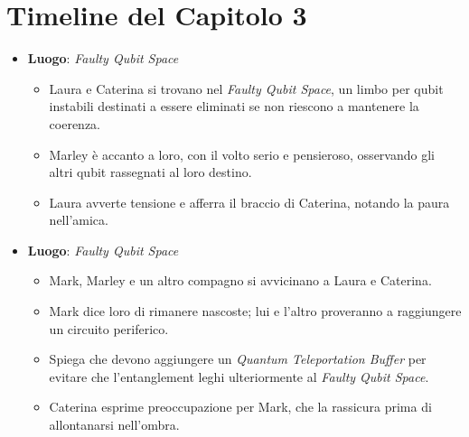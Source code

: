 \section*{Timeline del Capitolo 3}
\begin{itemize}
    \item \textbf{Luogo}: \emph{Faulty Qubit Space}
    \begin{itemize}
        \item Laura e Caterina si trovano nel \emph{Faulty Qubit Space}, un limbo per qubit instabili destinati a essere eliminati se non riescono a mantenere la coerenza.
        \item Marley è accanto a loro, con il volto serio e pensieroso, osservando gli altri qubit rassegnati al loro destino.
        \item Laura avverte tensione e afferra il braccio di Caterina, notando la paura nell'amica.
    \end{itemize}
\end{itemize}



\begin{itemize}
    \item \textbf{Luogo}: \emph{Faulty Qubit Space}
    \begin{itemize}
        \item Mark, Marley e un altro compagno si avvicinano a Laura e Caterina.
        \item Mark dice loro di rimanere nascoste; lui e l'altro proveranno a raggiungere un circuito periferico.
        \item Spiega che devono aggiungere un \emph{Quantum Teleportation Buffer} per evitare che l'entanglement leghi ulteriormente al \emph{Faulty Qubit Space}.
        \item Caterina esprime preoccupazione per Mark, che la rassicura prima di allontanarsi nell'ombra.
    \end{itemize}
\end{itemize}



